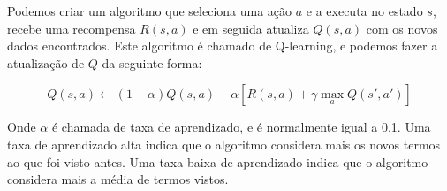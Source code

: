 \documentclass[a4paper,10pt]{article}
\theoremstyle{plain}
\begin{document}
Podemos criar um algoritmo que seleciona uma ação $a$ e a executa no estado $s$, recebe uma
recompensa $R(s,a)$ e em seguida atualiza $Q(s,a)$ com os novos dados encontrados. Este algoritmo
é chamado de Q-learning, e podemos fazer a atualização de $Q$ da seguinte forma:

\begin{equation*}
  Q(s, a) \gets (1-\alpha)Q(s,a) + \alpha[R(s,a) + \gamma \max_a Q(s', a')]
\end{equation*}

Onde $\alpha$ é chamada de taxa de aprendizado, e é normalmente igual a 0.1. Uma taxa de
aprendizado alta indica que o algoritmo considera mais os novos termos ao que foi visto antes. Uma
taxa baixa de aprendizado indica que o algoritmo considera mais a média de termos vistos.

\newpage
\printbibliography
\end{document}
